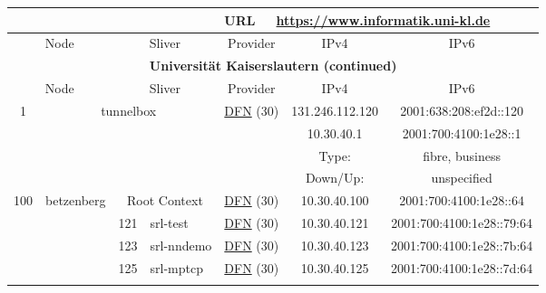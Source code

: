 \begin{small}
\begin{center}
\begin{longtable}{|c|c|c|c|c|c|c|c|}
 \multicolumn{4}{|c|}{} & \multicolumn{1}{|l|}{URL} & \multicolumn{3}{|l|}{\url{https://www.informatik.uni-kl.de}} \\ \hline
 \multicolumn{2}{|p{8em}|}{Node} & \multicolumn{2}{|p{8em}|}{Sliver} & \multicolumn{2}{|p{8em}|}{Provider} & IPv4 & IPv6 \\ \hline
\endfirsthead
\hline
 \multicolumn{8}{|c|}{\textbf{Universität Kaiserslautern (continued)}} \\ \hline
 \multicolumn{2}{|p{8em}|}{Node} & \multicolumn{2}{|p{8em}|}{Sliver} & \multicolumn{2}{|p{8em}|}{Provider} & IPv4 & IPv6 \\ \hline
\endhead
 \multirow{4}{*}{\tiny{1}} & \multicolumn{3}{|c|}{\multirow{4}{*}{\tiny{tunnelbox}}} & \multicolumn{2}{|c|}{\multirow{4}{*}{\tiny{\href{https://www.dfn.de}{DFN} (30)}}} & \tiny{131.246.112.120} & \tiny{2001:638:208:ef2d::120} \\* \cline{7-7}\cline{8-8}
  & \multicolumn{3}{|c|}{} & \multicolumn{2}{|c|}{} & \tiny{10.30.40.1} & \tiny{2001:700:4100:1e28::1} \\* \cline{7-7}\cline{8-8}
  & \multicolumn{3}{|c|}{} & \multicolumn{2}{|c|}{} & Type: & fibre, business \\* \cline{7-7}\cline{8-8}
  & \multicolumn{3}{|c|}{} & \multicolumn{2}{|c|}{} & Down/Up:  & unspecified \\ \hline
 \multirow{28}{*}{\tiny{100}} & \multicolumn{1}{|l|}{\multirow{28}{*}{\tiny{betzenberg}}} & \multicolumn{2}{|c|}{\tiny{Root Context}} & \multicolumn{2}{|c|}{\tiny{\href{https://www.dfn.de}{DFN} (30)}} & \tiny{10.30.40.100} & \tiny{2001:700:4100:1e28::64} \\* \cline{3-3}\cline{4-4}\cline{5-5}\cline{6-6}\cline{7-7}\cline{8-8}
  &  & \tiny{121} & \multicolumn{1}{|l|}{\tiny{srl-test}} & \multicolumn{2}{|c|}{\tiny{\href{https://www.dfn.de}{DFN} (30)}} & \tiny{10.30.40.121} & \tiny{2001:700:4100:1e28::79:64} \\* \cline{3-3}\cline{4-4}\cline{5-5}\cline{6-6}\cline{7-7}\cline{8-8}
  &  & \tiny{123} & \multicolumn{1}{|l|}{\tiny{srl-nndemo}} & \multicolumn{2}{|c|}{\tiny{\href{https://www.dfn.de}{DFN} (30)}} & \tiny{10.30.40.123} & \tiny{2001:700:4100:1e28::7b:64} \\* \cline{3-3}\cline{4-4}\cline{5-5}\cline{6-6}\cline{7-7}\cline{8-8}
  &  & \tiny{125} & \multicolumn{1}{|l|}{\tiny{srl-mptcp}} & \multicolumn{2}{|c|}{\tiny{\href{https://www.dfn.de}{DFN} (30)}} & \tiny{10.30.40.125} & \tiny{2001:700:4100:1e28::7d:64} \\* \cline{3-3}\cline{4-4}\cline{5-5}\cline{6-6}\cline{7-7}\cline{8-8}

\end{longtable}
\end{center}
\end{small}
